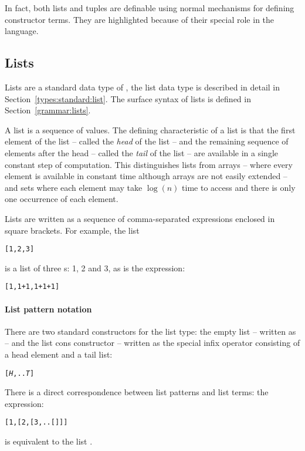 \begin{aside}
In fact, both lists and tuples are definable using normal \go mechanisms for defining constructor terms. They are highlighted because of their special role in the language.
\end{aside}

\subsection{Lists}
\label{expression:lists}

Lists are a standard data type of \go, the list data type is described in detail in Section~\vref{types:standard:list}. The surface syntax of lists is defined in Section~\vref{grammar:lists}. 

A list is a sequence of values. The defining characteristic of a list is that the first element of the list -- called  the \emph{head} of the list -- and the remaining sequence of elements after the head -- called the \emph{tail} of the list -- are available in a single constant step of computation. This distinguishes lists from arrays -- where every element is available in constant time although arrays are not easily extended -- and sets where each element may take $\log{}(n)$ time to access and there is only one occurrence of each element.

Lists are written as a sequence of comma-separated expressions enclosed in square brackets. For example, the list
\begin{alltt}
[1,2,3]
\end{alltt}
is a list of three s: 1, 2 and 3, as is the expression:
\begin{alltt}
[1,1+1,1+1+1]
\end{alltt}

\paragraph{List pattern notation}
There are two standard constructors for the list type: the empty list -- written as \q{[]} -- and the list cons constructor -- written as the special infix operator  consisting of a head element and a tail list:
\begin{alltt}
[\emph{H},..\emph{T}]
\end{alltt}
There is a direct correspondence between list patterns and list terms: the expression:
\begin{alltt}
[1,[2,[3,..[]]]
\end{alltt}
is equivalent to the list \q{[1,2,3]}.

